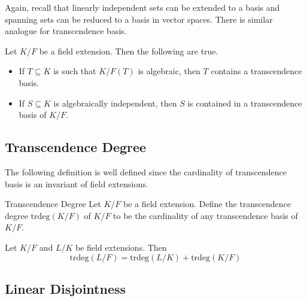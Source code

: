 \documentclass[a4paper]{article}
\begin{document}
Again, recall that linearly independent sets can be extended to a basis and spanning sets can be reduced to a basis in vector spaces. There is similar analogue for transcendence basis. 

\begin{thm}{}{} Let $K/F$ be a field extension. Then the following are true. 
\begin{itemize}
\item If $T\subseteq K$ is such that $K/F(T)$ is algebraic, then $T$ contains a transcendence basis. 
\item If $S\subseteq K$ is algebraically independent, then $S$ is contained in a transcendence basis of $K/F$. 
\end{itemize}
\end{thm}

\subsection{Transcendence Degree}
The following definition is well defined since the cardinality of transcendence basis is an invariant of field extensions. 

\begin{defn}{Transcendence Degree}{} Let $K/F$ be a field extension. Define the transcendence degree $\text{trdeg}(K/F)$ of $K/F$ to be the cardinality of any transcendence basis of $K/F$. 
\end{defn}

\begin{prp}{}{} Let $K/F$ and $L/K$ be field extensions. Then $$\text{trdeg}(L/F)=\text{trdeg}(L/K)+\text{trdeg}(K/F)$$
\end{prp}

\subsection{Linear Disjointness}
\end{document}
